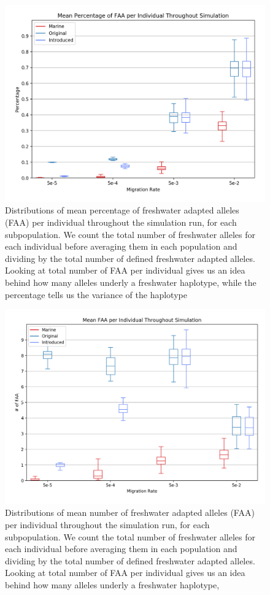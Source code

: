 \documentclass{article}
\begin{document}
\begin{figure}
	\begin{center}
  		\includegraphics[width=0.6\linewidth]{matplotlibPlots/MPFAI.png}
  		\caption{Distributions of mean percentage of freshwater adapted alleles (FAA) per individual throughout the simulation run, for each subpopulation.
		We count the total number of freshwater alleles for each individual before averaging them in each population and dividing by the total number of defined
		freshwater adapted alleles.
		Looking at total number of FAA per individual gives us an idea behind how many alleles underly a freshwater haplotype, 
		while the percentage tells us the variance of the haplotype}
		\label{fig:MPFAI}
	\end{center}
\end{figure}

\begin{figure}
	\begin{center}
  		\includegraphics[width=0.6\linewidth]{matplotlibPlots/MFAI.png}
  		\caption{Distributions of mean number of freshwater adapted alleles (FAA) per individual throughout the simulation run, for each subpopulation.
		We count the total number of freshwater alleles for each individual before averaging them in each population and dividing by the total number of defined
		freshwater adapted alleles.
		Looking at total number of FAA per individual gives us an idea behind how many alleles underly a freshwater haplotype, 
		}
  		\label{fig:MPFAI}
	\end{center}
\end{figure}
\end{document}
